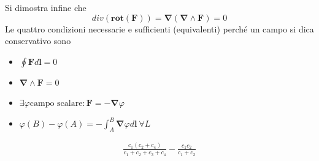\documentclass[10pt,a4paper]{article}
\begin{document}
Si dimostra infine che 
\[div(\mathbf{rot}(\mathbf{F})) =\mathbf{\nabla}(\mathbf{\nabla}\wedge\mathbf{F})=0\]
Le quattro condizioni necessarie e sufficienti (equivalenti) perché un campo si dica conservativo sono
\begin{itemize}
	\item \(\oint \mathbf{F}d\mathbf{l} = 0 \)
	\item \(\mathbf{\nabla}\wedge\mathbf{F} = 0\)
	\item \(\exists\varphi \text{campo scalare} : \mathbf{F}=-\mathbf{\nabla}\varphi\)
	\item \(\varphi(B)-\varphi(A) = -\int_{A}^{B}\mathbf{\nabla}\varphi d\mathbf{l}\ \forall L\)
\end{itemize}
\begin{align*}
\frac{c_1(c_2+c_4)}{c_1+c_2+c_3+c_4}-\frac{c_1c_2}{c_1+c_2}
\end{align*}
\end{document}
